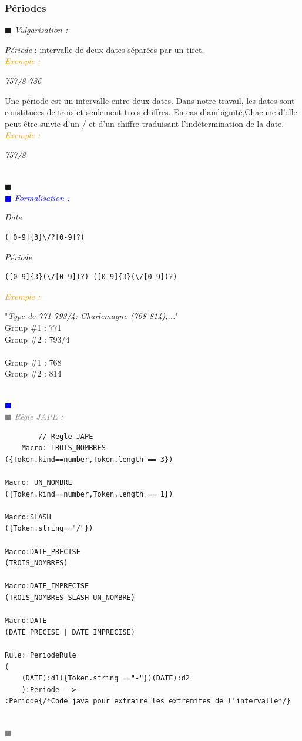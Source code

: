 \documentclass[a4paper, 11pt]{report}
\newenvironment{vulgarisation}
    {
    \textit{\textcolor{dark-blue}{$\blacksquare$  Vulgarisation : \\}}

    }
    {
    ~\\\textcolor{dark-blue}{$\blacksquare$}\\
    }
\newenvironment{formalisation}
    {
    \textit{\textcolor{blue}{$\blacksquare$  Formalisation : \\}}
    }
    {
    ~\\\textcolor{blue}{$\blacksquare$}\\
    }
\newenvironment{codage}
    {
    \textit{\textcolor{gray}{$\blacksquare$  Règle JAPE : \\}}
    }
    {
    ~\\\textcolor{gray}{$\blacksquare$}\\
    }
\newenvironment{exemple}
    {
    \textit{\textcolor{orange}{
    Exemple : \\}}
    }
    {\\
    }
\begin{document}
	\subsubsection{Périodes}
\begin{vulgarisation}
	\textit{Période} : intervalle de deux dates séparées par un tiret.\\
	\begin{exemple}
		\textit{757/8-786}
	\end{exemple}
	
	Une période est un intervalle entre deux dates. Dans notre travail, les dates sont constituées de trois et seulement trois chiffres. En cas d'ambiguïté,Chacune d'elle peut être suivie d'un \og/\fg{} et d'un chiffre traduisant l'indétermination de la date.\\
	\begin{exemple}
		\textit{757/8}
	\end{exemple}
	
\end{vulgarisation}
\begin{formalisation}
	\textit{Date}
	\begin{verbatim}
([0-9]{3}\/?[0-9]?)
	\end{verbatim}
	\textit{Période}
	\begin{verbatim}
([0-9]{3}(\/[0-9])?)-([0-9]{3}(\/[0-9])?)
	\end{verbatim}
	\begin{exemple}
		"\emph{Type de 771-793/4: Charlemagne (768-814),...}" \\
		Group \#1 : 771 \\
		Group \#2 : 793/4\\\\\noindent
		Group \#1 : 768 \\
		Group \#2 : 814
	\end{exemple}
\end{formalisation}
	\begin{codage}
	\begin{lstlisting}
		// Regle JAPE
	Macro: TROIS_NOMBRES
({Token.kind==number,Token.length == 3})

Macro: UN_NOMBRE
({Token.kind==number,Token.length == 1})

Macro:SLASH
({Token.string=="/"})

Macro:DATE_PRECISE
(TROIS_NOMBRES)

Macro:DATE_IMPRECISE
(TROIS_NOMBRES SLASH UN_NOMBRE)

Macro:DATE
(DATE_PRECISE | DATE_IMPRECISE)

Rule: PeriodeRule
(
	(DATE):d1({Token.string =="-"})(DATE):d2
    ):Periode -->
:Periode{/*Code java pour extraire les extremites de l'intervalle*/}
	\end{lstlisting}
	\end{codage}
	
\end{document}

